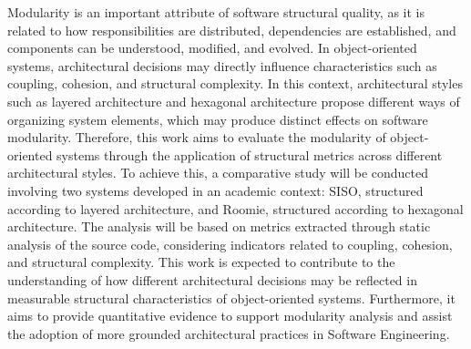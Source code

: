 Modularity is an important attribute of software structural quality, as it is related to how responsibilities are distributed, 
dependencies are established, and components can be understood, modified, and evolved. In object-oriented systems, architectural 
decisions may directly influence characteristics such as coupling, cohesion, and structural complexity. In this context, architectural 
styles such as layered architecture and hexagonal architecture propose different ways of organizing system elements, which may produce 
distinct effects on software modularity. Therefore, this work aims to evaluate the modularity of object-oriented systems through the 
application of structural metrics across different architectural styles. To achieve this, a comparative study will be conducted involving 
two systems developed in an academic context: SISO, structured according to layered architecture, and Roomie, structured according to 
hexagonal architecture. The analysis will be based on metrics extracted through static analysis of the source code, considering indicators 
related to coupling, cohesion, and structural complexity. This work is expected to contribute to the understanding of how different 
architectural decisions may be reflected in measurable structural characteristics of object-oriented systems. Furthermore, it aims 
to provide quantitative evidence to support modularity analysis and assist the adoption of more grounded architectural practices in 
Software Engineering.

